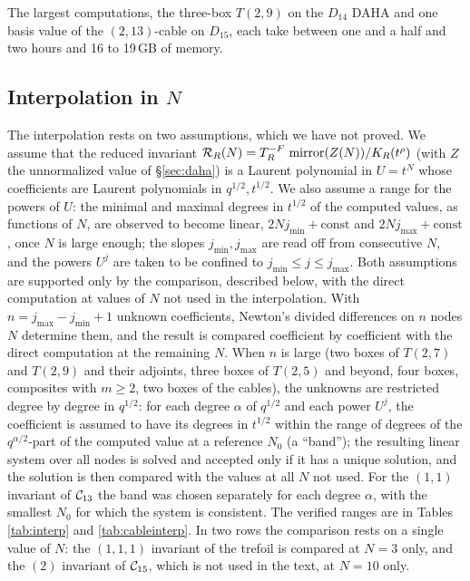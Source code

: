 The largest computations, the three-box $T(2,9)$ on the $D_{14}$ DAHA and one basis value of the $(2,13)$-cable on $D_{15}$, each take between one and a half and two hours and 16 to 19\,GB of memory.

\subsection{Interpolation in \texorpdfstring{$N$}{N}}\label{app:interp}
The interpolation rests on two assumptions, which we have not proved. We assume that the reduced invariant $\mathcal{R}_R(N) = T_R^{-F}\,\operatorname{mirror}(Z(N))/K_R(t^\rho)$ (with $Z$ the unnormalized value of \S\ref{sec:daha}) is a Laurent polynomial in $U = t^N$ whose coefficients are Laurent polynomials in $q^{1/2}, t^{1/2}$. We also assume a range for the powers of $U$: the minimal and maximal degrees in $t^{1/2}$ of the computed values, as functions of $N$, are observed to become linear, $2Nj_{\min} + \mathrm{const}$ and $2Nj_{\max} + \mathrm{const}$, once $N$ is large enough; the slopes $j_{\min}, j_{\max}$ are read off from consecutive $N$, and the powers $U^j$ are taken to be confined to $j_{\min} \le j \le j_{\max}$. Both assumptions are supported only by the comparison, described below, with the direct computation at values of $N$ not used in the interpolation. With $n = j_{\max} - j_{\min} + 1$ unknown coefficients, Newton's divided differences on $n$ nodes $N$ determine them, and the result is compared coefficient by coefficient with the direct computation at the remaining $N$. When $n$ is large (two boxes of $T(2,7)$ and $T(2,9)$ and their adjoints, three boxes of $T(2,5)$ and beyond, four boxes, composites with $m \ge 2$, two boxes of the cables), the unknowns are restricted degree by degree in $q^{1/2}$: for each degree $\alpha$ of $q^{1/2}$ and each power $U^j$, the coefficient is assumed to have its degrees in $t^{1/2}$ within the range of degrees of the $q^{\alpha/2}$-part of the computed value at a reference $N_0$ (a ``band''); the resulting linear system over all nodes is solved and accepted only if it has a unique solution, and the solution is then compared with the values at all $N$ not used. For the $(1,1)$ invariant of $\mathcal{C}_{13}$ the band was chosen separately for each degree $\alpha$, with the smallest $N_0$ for which the system is consistent. The verified ranges are in Tables \ref{tab:interp} and \ref{tab:cableinterp}. In two rows the comparison rests on a single value of $N$: the $(1,1,1)$ invariant of the trefoil is compared at $N = 3$ only, and the $(2)$ invariant of $\mathcal{C}_{15}$, which is not used in the text, at $N = 10$ only.

